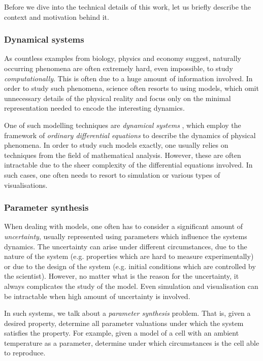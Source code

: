 Before we dive into the technical details of this work, let us briefly describe the context and motivation behind it.

\subsubsection{\textbf{Dynamical systems}}

As countless examples from biology, physics and economy suggest, naturally occurring phenomena are often extremely hard, even impossible, to study \emph{computationally}. This is often due to a huge amount of information involved. In order to study such phenomena, science often resorts to using models, which omit unnecessary details of the physical reality and focus only on the minimal representation needed to encode the interesting dynamics.

One of such modelling techniques are \emph{dynamical systems} \cite{dynSys, dynSys2}, which employ the framework of \emph{ordinary differential equations} to describe the dynamics of physical phenomena. In order to study such models exactly, one usually relies on techniques from the field of mathematical analysis. However, these are often intractable due to the sheer complexity of the differential equations involved. In such cases, one often needs to resort to simulation or various types of visualisations.

\subsubsection{\textbf{Parameter synthesis}}

When dealing with models, one often has to consider a significant amount of \emph{uncertainty}, usually represented using parameters which influence the systems dynamics. The uncertainty can arise under different circumstances, due to the nature of the system (e.g. properties which are hard to measure experimentally) or due to the design of the system (e.g. initial conditions which are controlled by the scientist). However, no matter what is the reason for the uncertainty, it always complicates the study of the model. Even simulation and visualisation can be intractable when high amount of uncertainty is involved. 

In such systems, we talk about a \emph{parameter synthesis} problem. That is, given a desired property, determine all parameter valuations under which the system satisfies the property. For example, given a model of a cell with an ambient temperature as a parameter, determine under which circumstances is the cell able to reproduce. 

